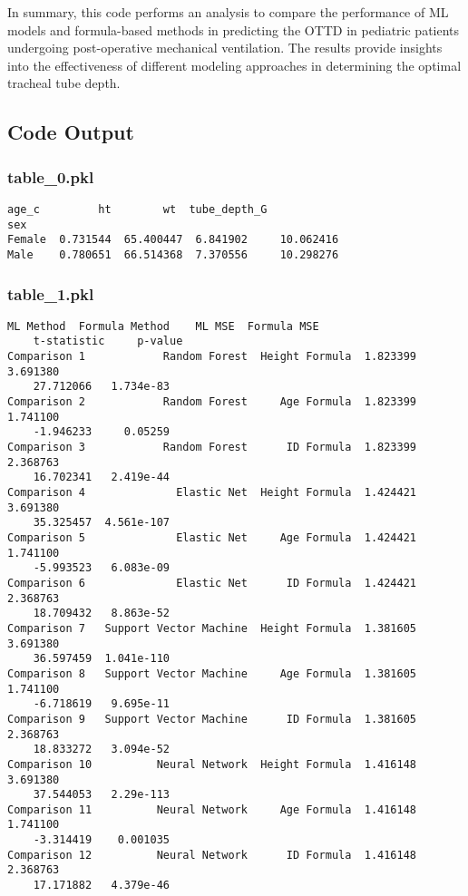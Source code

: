 \documentclass[11pt]{article}
\begin{document}
In summary, this code performs an analysis to compare the performance of ML models and formula-based methods in predicting the OTTD in pediatric patients undergoing post-operative mechanical ventilation. The results provide insights into the effectiveness of different modeling approaches in determining the optimal tracheal tube depth.

\subsection{Code Output}

\subsubsection*{table\_0.pkl}

\begin{Verbatim}[tabsize=4]
           age_c         ht        wt  tube_depth_G
sex
Female  0.731544  65.400447  6.841902     10.062416
Male    0.780651  66.514368  7.370556     10.298276
\end{Verbatim}

\subsubsection*{table\_1.pkl}

\begin{Verbatim}[tabsize=4]
                            ML Method  Formula Method    ML MSE  Formula MSE
	t-statistic     p-value
Comparison 1            Random Forest  Height Formula  1.823399     3.691380
	27.712066   1.734e-83
Comparison 2            Random Forest     Age Formula  1.823399     1.741100
	-1.946233     0.05259
Comparison 3            Random Forest      ID Formula  1.823399     2.368763
	16.702341   2.419e-44
Comparison 4              Elastic Net  Height Formula  1.424421     3.691380
	35.325457  4.561e-107
Comparison 5              Elastic Net     Age Formula  1.424421     1.741100
	-5.993523   6.083e-09
Comparison 6              Elastic Net      ID Formula  1.424421     2.368763
	18.709432   8.863e-52
Comparison 7   Support Vector Machine  Height Formula  1.381605     3.691380
	36.597459  1.041e-110
Comparison 8   Support Vector Machine     Age Formula  1.381605     1.741100
	-6.718619   9.695e-11
Comparison 9   Support Vector Machine      ID Formula  1.381605     2.368763
	18.833272   3.094e-52
Comparison 10          Neural Network  Height Formula  1.416148     3.691380
	37.544053   2.29e-113
Comparison 11          Neural Network     Age Formula  1.416148     1.741100
	-3.314419    0.001035
Comparison 12          Neural Network      ID Formula  1.416148     2.368763
	17.171882   4.379e-46
\end{Verbatim}
\end{document}
